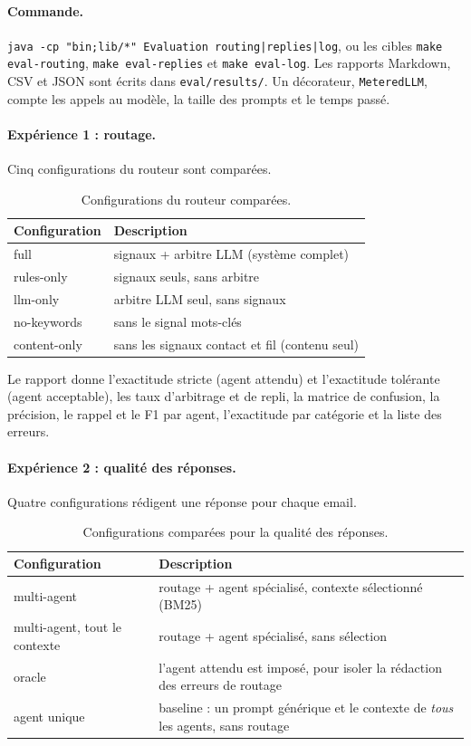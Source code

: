 \documentclass[11pt,a4paper]{article}
\newcommand{\code}[1]{\texttt{#1}}
\begin{document}
\paragraph{Commande.} \code{java -cp "bin;lib/*" Evaluation routing|replies|log}, ou les
cibles \code{make eval-routing}, \code{make eval-replies} et \code{make eval-log}. Les
rapports Markdown, CSV et JSON sont écrits dans \code{eval/results/}. Un décorateur,
\code{MeteredLLM}, compte les appels au modèle, la taille des prompts et le temps passé.

\paragraph{Expérience 1 : routage.} Cinq configurations du routeur sont comparées.

\begin{table}[H]
\centering
\small
\begin{tabularx}{\linewidth}{l L}
\toprule
\textbf{Configuration} & \textbf{Description} \\
\midrule
full & signaux + arbitre LLM (système complet) \\
rules-only & signaux seuls, sans arbitre \\
llm-only & arbitre LLM seul, sans signaux \\
no-keywords & sans le signal mots-clés \\
content-only & sans les signaux contact et fil (contenu seul) \\
\bottomrule
\end{tabularx}
\caption{Configurations du routeur comparées.}
\end{table}

Le rapport donne l'exactitude stricte (agent attendu) et l'exactitude tolérante (agent
acceptable), les taux d'arbitrage et de repli, la matrice de confusion, la précision, le
rappel et le F1 par agent, l'exactitude par catégorie et la liste des erreurs.

\paragraph{Expérience 2 : qualité des réponses.} Quatre configurations rédigent une
réponse pour chaque email.

\begin{table}[H]
\centering
\small
\begin{tabularx}{\linewidth}{l L}
\toprule
\textbf{Configuration} & \textbf{Description} \\
\midrule
multi-agent & routage + agent spécialisé, contexte sélectionné (BM25) \\
multi-agent, tout le contexte & routage + agent spécialisé, sans sélection \\
oracle & l'agent attendu est imposé, pour isoler la rédaction des erreurs de routage \\
agent unique & baseline : un prompt générique et le contexte de \emph{tous} les agents, sans routage \\
\bottomrule
\end{tabularx}
\caption{Configurations comparées pour la qualité des réponses.}
\end{table}
\end{document}
